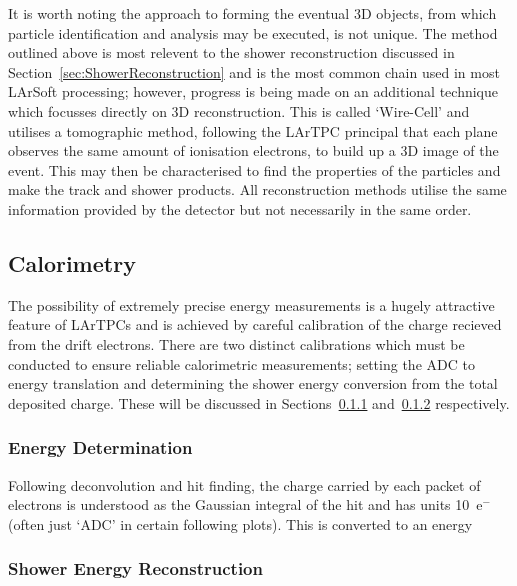 It is worth noting the approach to forming the eventual 3D objects, from which particle identification and analysis may be executed, is not unique.  The method outlined above is most relevent to the shower reconstruction discussed in Section~\ref{sec:ShowerReconstruction} and is the most common chain used in most LArSoft processing; however, progress is being made on an additional technique which focusses directly on 3D reconstruction.  This is called `Wire-Cell' \cite{WireCellWebsite} and utilises a tomographic method, following the LArTPC principal that each plane observes the same amount of ionisation electrons, to build up a 3D image of the event.  This may then be characterised to find the properties of the particles and make the track and shower products.  All reconstruction methods utilise the same information provided by the detector but not necessarily in the same order.

\subsection{Calorimetry}\label{sec:Calorimetry}

The possibility of extremely precise energy measurements is a hugely attractive feature of LArTPCs and is achieved by careful calibration of the charge recieved from the drift electrons.  There are two distinct calibrations which must be conducted to ensure reliable calorimetric measurements; setting the ADC to energy translation and determining the shower energy conversion from the total deposited charge.  These will be discussed in Sections~\ref{sec:EnergyDetermination} and~\ref{sec:ShowerEnergy} respectively.

\subsubsection{Energy Determination}\label{sec:EnergyDetermination}

Following deconvolution and hit finding, the charge carried by each packet of electrons is understood as the Gaussian integral of the hit and has units 10~e$^-$ (often just `ADC' in certain following plots).  This is converted to an energy

\subsubsection{Shower Energy Reconstruction}\label{sec:ShowerEnergy}

